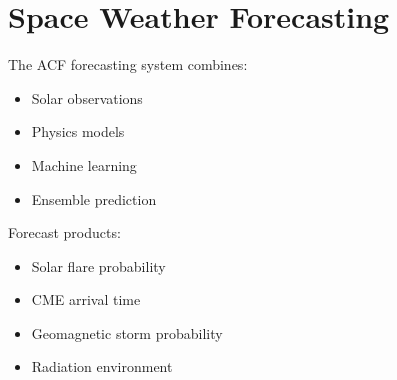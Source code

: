 \section{Space Weather Forecasting}


The ACF forecasting system combines:


\begin{itemize}

\item Solar observations

\item Physics models

\item Machine learning

\item Ensemble prediction

\end{itemize}



Forecast products:


\begin{itemize}

\item Solar flare probability

\item CME arrival time

\item Geomagnetic storm probability

\item Radiation environment

\end{itemize}
